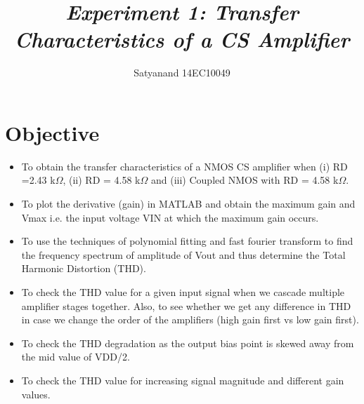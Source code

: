 \documentclass[12pt]{article}
\title{{\it \textbf{Experiment 1:\hspace{0.5cm} Transfer Characteristics of a CS Amplifier}\/} }
\author
{Satyanand 14EC10049\\
\normalize{Rohit Kumar 14EC10043}
}
\date{}
\renewcommand{\baselinestretch}{0.5}
\begin{document}
 


\baselineskip14pt


\maketitle 








\renewcommand{\baselinestretch}{0.5} 

\section*{Objective}
\begin{itemize}
\item To obtain the transfer characteristics of a NMOS CS amplifier when (i) RD =2.43 k$\Omega$, (ii) RD = 4.58 k$\Omega$ and (iii) Coupled NMOS with RD = 4.58 k$\Omega$.
\item To plot the derivative (gain) in MATLAB and obtain the maximum gain and Vmax i.e. the input voltage VIN at which the maximum gain occurs.
\item To use the techniques of polynomial fitting and fast fourier transform to find the frequency spectrum of amplitude of Vout and thus determine the Total Harmonic Distortion (THD).
\item To check the THD value for a given input signal when we cascade multiple amplifier stages together. Also, to see whether we get any difference in THD in case we change the order of the amplifiers (high gain first vs low gain first).
\item To check the THD degradation as the output bias point is skewed away from the mid value of VDD/2.
\item To check the THD value for increasing signal magnitude and different gain values.
\end{itemize}
\end{document}
